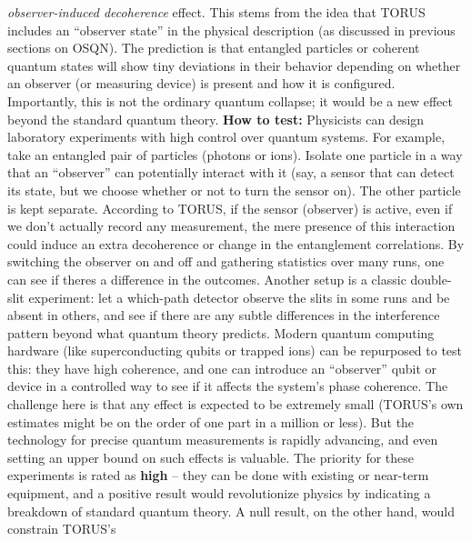 \documentclass[
]{article}
\begin{document}
{\begin{itemize}
  \emph{observer-induced decoherence} effect. This stems from the idea
  that TORUS includes an ``observer state'' in the physical description
  (as discussed in previous sections on OSQN). The prediction is that
  entangled particles or coherent quantum states will show tiny
  deviations in their behavior depending on whether an observer (or
  measuring device) is present and how it is configured\hspace{0pt}.
  Importantly, this is not the ordinary quantum collapse; it would be a
  new effect beyond the standard quantum theory. \textbf{How to test:}
  Physicists can design laboratory experiments with high control over
  quantum systems. For example, take an entangled pair of particles
  (photons or ions). Isolate one particle in a way that an ``observer''
  can potentially interact with it (say, a sensor that can detect its
  state, but we choose whether or not to turn the sensor on). The other
  particle is kept separate. According to TORUS, if the sensor
  (observer) is active, even if we don't actually record any
  measurement, the mere presence of this interaction could induce an
  extra decoherence or change in the entanglement correlations. By
  switching the observer on and off and gathering statistics over many
  runs, one can see if there\textquotesingle s a difference in the
  outcomes\hspace{0pt}. Another setup is a classic double-slit
  experiment: let a which-path detector observe the slits in some runs
  and be absent in others, and see if there are any subtle differences
  in the interference pattern beyond what quantum theory predicts.
  Modern quantum computing hardware (like superconducting qubits or
  trapped ions) can be repurposed to test this: they have high
  coherence, and one can introduce an ``observer'' qubit or device in a
  controlled way to see if it affects the system's phase
  coherence\hspace{0pt}. The challenge here is that any effect is
  expected to be extremely small (TORUS's own estimates might be on the
  order of one part in a million or less\hspace{0pt}). But the
  technology for precise quantum measurements is rapidly advancing, and
  even setting an upper bound on such effects is valuable. The priority
  for these experiments is rated as \textbf{high} -- they can be done
  with existing or near-term equipment, and a positive result would
  revolutionize physics by indicating a breakdown of standard quantum
  theory. A null result, on the other hand, would constrain TORUS's

\end{itemize}}
\end{document}
